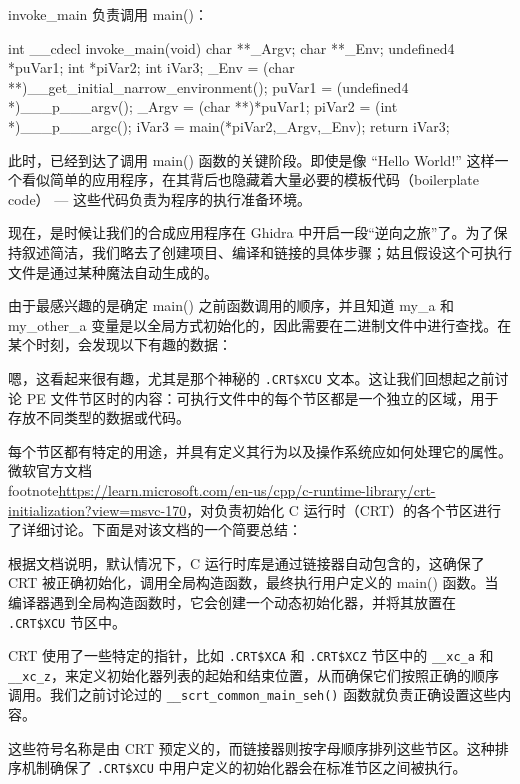 
invoke\_main 负责调用 main()：

\begin{cpp}
int __cdecl invoke_main(void) {
  char **_Argv;
  char **_Env;
  undefined4 *puVar1;
  int *piVar2;
  int iVar3;
  _Env = (char **)__get_initial_narrow_environment();
  puVar1 = (undefined4 *)___p___argv();
  _Argv = (char **)*puVar1;
  piVar2 = (int *)___p___argc();
  iVar3 = main(*piVar2,_Argv,_Env);
  return iVar3;
}
\end{cpp}

此时，已经到达了调用 main() 函数的关键阶段。即使是像 “Hello World!” 这样一个看似简单的应用程序，在其背后也隐藏着大量必要的模板代码（boilerplate code） --- 这些代码负责为程序的执行准备环境。

现在，是时候让我们的合成应用程序在 Ghidra 中开启一段“逆向之旅”了。为了保持叙述简洁，我们略去了创建项目、编译和链接的具体步骤；姑且假设这个可执行文件是通过某种魔法自动生成的。

由于最感兴趣的是确定 main() 之前函数调用的顺序，并且知道 my\_a 和 my\_other\_a 变量是以全局方式初始化的，因此需要在二进制文件中进行查找。在某个时刻，会发现以下有趣的数据：


嗯，这看起来很有趣，尤其是那个神秘的 \verb|.CRT$XCU| 文本。这让我们回想起之前讨论 PE 文件节区时的内容：可执行文件中的每个节区都是一个独立的区域，用于存放不同类型的数据或代码。

每个节区都有特定的用途，并具有定义其行为以及操作系统应如何处理它的属性。微软官方文档\\footnote{\url{https://learn.microsoft.com/en-us/cpp/c-runtime-library/crt-initialization?view=msvc-170}}，对负责初始化 C 运行时（CRT）的各个节区进行了详细讨论。下面是对该文档的一个简要总结：

根据文档说明，默认情况下，C 运行时库是通过链接器自动包含的，这确保了 CRT 被正确初始化，调用全局构造函数，最终执行用户定义的 main() 函数。当编译器遇到全局构造函数时，它会创建一个动态初始化器，并将其放置在 \verb|.CRT$XCU| 节区中。

CRT 使用了一些特定的指针，比如 \verb|.CRT$XCA| 和 \verb|.CRT$XCZ| 节区中的 \verb|__xc_a| 和 \verb|__xc_z|，来定义初始化器列表的起始和结束位置，从而确保它们按照正确的顺序调用。我们之前讨论过的 \verb|__scrt_common_main_seh()| 函数就负责正确设置这些内容。

这些符号名称是由 CRT 预定义的，而链接器则按字母顺序排列这些节区。这种排序机制确保了 \verb|.CRT$XCU| 中用户定义的初始化器会在标准节区之间被执行。

